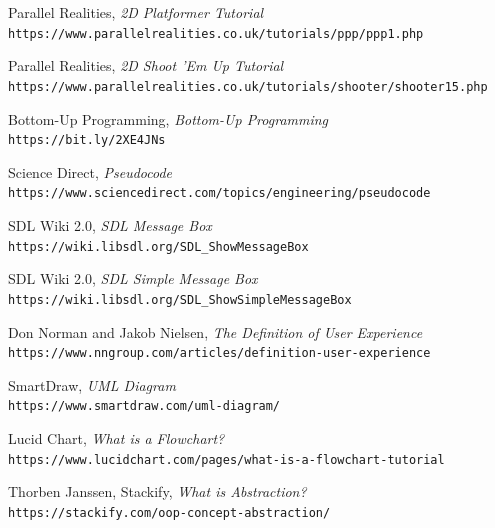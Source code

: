 \documentclass{article}
\begin{document}
\begin{thebibliography}{9}

Parallel Realities,
\textit{2D Platformer Tutorial} \\
\texttt{https://www.parallelrealities.co.uk/tutorials/ppp/ppp1.php}

Parallel Realities,
\textit{2D Shoot 'Em Up Tutorial} \\
\texttt{https://www.parallelrealities.co.uk/tutorials/shooter/shooter15.php}

Bottom-Up Programming,
\textit{Bottom-Up Programming} \\
\texttt{https://bit.ly/2XE4JNs}

Science Direct,
\textit{Pseudocode} \\
\texttt{https://www.sciencedirect.com/topics/engineering/pseudocode}


SDL Wiki 2.0,
\textit{SDL Message Box} \\
\texttt{https://wiki.libsdl.org/SDL_ShowMessageBox}

SDL Wiki 2.0,
\textit{SDL Simple Message Box} \\
\texttt{https://wiki.libsdl.org/SDL_ShowSimpleMessageBox}


Don Norman and Jakob Nielsen,
\textit{The Definition of User Experience} \\
\texttt{https://www.nngroup.com/articles/definition-user-experience}

SmartDraw,
\textit{UML Diagram } \\
\texttt{https://www.smartdraw.com/uml-diagram/}

Lucid Chart,
\textit{What is a Flowchart?} \\
\texttt{https://www.lucidchart.com/pages/what-is-a-flowchart-tutorial}

Thorben Janssen, Stackify,
\textit{What is Abstraction?} \\
\texttt{https://stackify.com/oop-concept-abstraction/}


\end{thebibliography}
\cleardoublepage
{}
\end{document}
